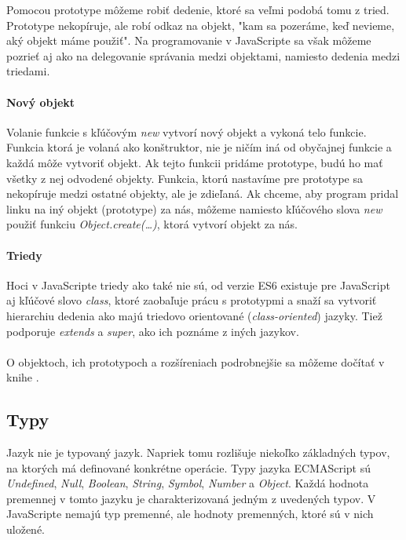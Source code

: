 Pomocou prototype môžeme robiť dedenie, ktoré sa veľmi podobá tomu z tried. Prototype nekopíruje, ale robí odkaz na objekt, "kam sa pozeráme, keď nevieme, aký objekt máme použiť".
Na programovanie v JavaScripte sa však môžeme pozrieť aj ako na delegovanie správania medzi objektami, namiesto dedenia medzi triedami.

\paragraph{Nový objekt}
Volanie funkcie s kľúčovým \emph{new} vytvorí nový objekt a vykoná telo funkcie. Funkcia ktorá je volaná ako konštruktor, nie je ničím iná od obyčajnej funkcie a každá môže vytvoriť objekt.
Ak tejto funkcii pridáme prototype, budú ho mať všetky z nej odvodené objekty. Funkcia, ktorú nastavíme pre prototype sa nekopíruje medzi ostatné objekty, ale je zdieľaná.
Ak chceme, aby program pridal linku na iný objekt (prototype) za nás, môžeme namiesto kľúčového slova \emph{new} použiť funkciu \emph{Object.create(\ldots)}, ktorá vytvorí objekt za nás.

\paragraph{Triedy}
Hoci v JavaScripte triedy ako také nie sú, od verzie ES6 existuje pre JavaScript aj kľúčové slovo \emph{class}, ktoré zaobaľuje prácu s prototypmi a snaží sa vytvoriť hierarchiu dedenia ako majú triedovo orientované (\emph{class-oriented}) jazyky. Tiež podporuje \emph{extends} a \emph{super}, ako ich poznáme z iných jazykov.

\paragraph{}
\NEW{}
O objektoch, ich prototypoch a rozšíreniach podrobnejšie sa môžeme dočítať v knihe \cite[this \& Object Prototypes]{youDontKnowJS3}.

\subsection{Typy}
Jazyk \JS{} nie je typovaný jazyk. Napriek tomu rozlišuje niekoľko základných typov, na ktorých má definované konkrétne operácie. Typy jazyka ECMAScript sú \emph{Undefined}, \emph{Null}, \emph{Boolean}, \emph{String}, \emph{Symbol}, \emph{Number} a \emph{Object}. Každá hodnota premennej v tomto jazyku je charakterizovaná jedným z uvedených typov. V JavaScripte nemajú typ premenné, ale hodnoty premenných, ktoré sú v nich uložené. 

